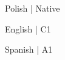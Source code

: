 \documentclass{article}
\begin{document}
\begin{minipage}[ht]{.3\textwidth}
\centering
Polish | Native
\end{minipage}
\begin{minipage}[ht]{.3\textwidth}
\centering
English | C1
\end{minipage}
\begin{minipage}[ht]{.3\textwidth}
\centering
Spanish | A1
\end{minipage}


\end{document}
